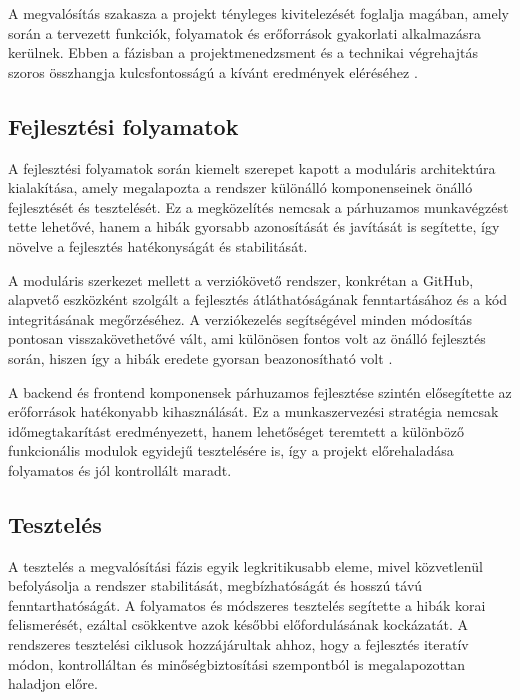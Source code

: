 A megvalósítás szakasza a projekt tényleges kivitelezését foglalja magában, amely során a tervezett funkciók, 
folyamatok és erőforrások gyakorlati alkalmazásra kerülnek. Ebben a fázisban a projektmenedzsment 
és a technikai végrehajtás szoros összhangja kulcsfontosságú a kívánt eredmények eléréséhez \cite{Hajdu2014,Szalay2018,Kaposi2019}.

\subsection{Fejlesztési folyamatok}

A fejlesztési folyamatok során kiemelt szerepet kapott a moduláris architektúra kialakítása, amely megalapozta a rendszer különálló komponenseinek önálló fejlesztését és tesztelését.  
Ez a megközelítés nemcsak a párhuzamos munkavégzést tette lehetővé, hanem a hibák gyorsabb azonosítását és javítását is segítette, így növelve a fejlesztés hatékonyságát és stabilitását.  

A moduláris szerkezet mellett a verziókövető rendszer, konkrétan a GitHub, alapvető eszközként szolgált a fejlesztés átláthatóságának 
fenntartásához és a kód integritásának megőrzéséhez.  
A verziókezelés segítségével minden módosítás pontosan visszakövethetővé vált, ami különösen fontos volt az önálló fejlesztés során, 
hiszen így a hibák eredete gyorsan beazonosítható volt \cite{Kovacs2016,Kaposi2019}.  

A backend és frontend komponensek párhuzamos fejlesztése szintén elősegítette az erőforrások hatékonyabb kihasználását.  
Ez a munkaszervezési stratégia nemcsak időmegtakarítást eredményezett, hanem lehetőséget teremtett a különböző funkcionális modulok 
egyidejű tesztelésére is, így a projekt előrehaladása folyamatos és jól kontrollált maradt.

\subsection{Tesztelés}

A tesztelés a megvalósítási fázis egyik legkritikusabb eleme, mivel közvetlenül befolyásolja a rendszer stabilitását, megbízhatóságát és hosszú távú fenntarthatóságát.  
A folyamatos és módszeres tesztelés segítette a hibák korai felismerését, ezáltal csökkentve azok későbbi előfordulásának kockázatát.  
A rendszeres tesztelési ciklusok hozzájárultak ahhoz, hogy a fejlesztés iteratív módon, kontrolláltan és minőségbiztosítási szempontból is megalapozottan haladjon előre.  

